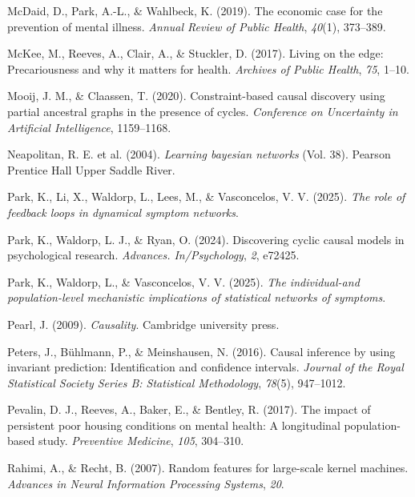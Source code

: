 \documentclass[
]{article}
\newlength{\cslhangindent}
\newenvironment{CSLReferences}[2] %
 {\begin{list}{}{%
  \setlength{\itemindent}{0pt}
  \setlength{\leftmargin}{0pt}
  \setlength{\parsep}{0pt}
  \ifodd #1
   \setlength{\leftmargin}{\cslhangindent}
   \setlength{\itemindent}{-1\cslhangindent}
  \fi
  \setlength{\itemsep}{#2\baselineskip}}}
 {\end{list}}
\begin{document}
\begin{CSLReferences}{1}{0}
McDaid, D., Park, A.-L., \& Wahlbeck, K. (2019). The economic case for
the prevention of mental illness. \emph{Annual Review of Public Health},
\emph{40}(1), 373--389.

McKee, M., Reeves, A., Clair, A., \& Stuckler, D. (2017). Living on the
edge: Precariousness and why it matters for health. \emph{Archives of
Public Health}, \emph{75}, 1--10.

Mooij, J. M., \& Claassen, T. (2020). Constraint-based causal discovery
using partial ancestral graphs in the presence of cycles.
\emph{Conference on Uncertainty in Artificial Intelligence}, 1159--1168.

Neapolitan, R. E. et al. (2004). \emph{Learning bayesian networks} (Vol.
38). Pearson Prentice Hall Upper Saddle River.

Park, K., Li, X., Waldorp, L., Lees, M., \& Vasconcelos, V. V. (2025).
\emph{The role of feedback loops in dynamical symptom networks}.

Park, K., Waldorp, L. J., \& Ryan, O. (2024). Discovering cyclic causal
models in psychological research. \emph{Advances. In/Psychology},
\emph{2}, e72425.

Park, K., Waldorp, L., \& Vasconcelos, V. V. (2025). \emph{The
individual-and population-level mechanistic implications of statistical
networks of symptoms}.

Pearl, J. (2009). \emph{Causality}. Cambridge university press.

Peters, J., Bühlmann, P., \& Meinshausen, N. (2016). Causal inference by
using invariant prediction: Identification and confidence intervals.
\emph{Journal of the Royal Statistical Society Series B: Statistical
Methodology}, \emph{78}(5), 947--1012.

Pevalin, D. J., Reeves, A., Baker, E., \& Bentley, R. (2017). The impact
of persistent poor housing conditions on mental health: A longitudinal
population-based study. \emph{Preventive Medicine}, \emph{105},
304--310.

Rahimi, A., \& Recht, B. (2007). Random features for large-scale kernel
machines. \emph{Advances in Neural Information Processing Systems},
\emph{20}.


\end{CSLReferences}
\end{document}
